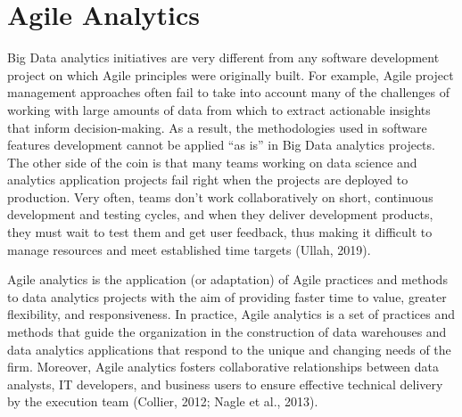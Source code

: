 \documentclass[
  letterpaper,
  DIV=11,
  numbers=noendperiod]{scrreprt}
\begin{document}
\hypertarget{agile-analytics}{%
\section{Agile Analytics}\label{agile-analytics}}

Big Data analytics initiatives are very different from any software
development project on which Agile principles were originally built. For
example, Agile project management approaches often fail to take into
account many of the challenges of working with large amounts of data
from which to extract actionable insights that inform decision-making.
As a result, the methodologies used in software features development
cannot be applied ``as is'' in Big Data analytics projects. The other
side of the coin is that many teams working on data science and
analytics application projects fail right when the projects are deployed
to production. Very often, teams don't work collaboratively on short,
continuous development and testing cycles, and when they deliver
development products, they must wait to test them and get user feedback,
thus making it difficult to manage resources and meet established time
targets (Ullah, 2019).

Agile analytics is the application (or adaptation) of Agile practices
and methods to data analytics projects with the aim of providing faster
time to value, greater flexibility, and responsiveness. In practice,
Agile analytics is a set of practices and methods that guide the
organization in the construction of data warehouses and data analytics
applications that respond to the unique and changing needs of the firm.
Moreover, Agile analytics fosters collaborative relationships between
data analysts, IT developers, and business users to ensure effective
technical delivery by the execution team (Collier, 2012; Nagle et al.,
2013).
\end{document}
